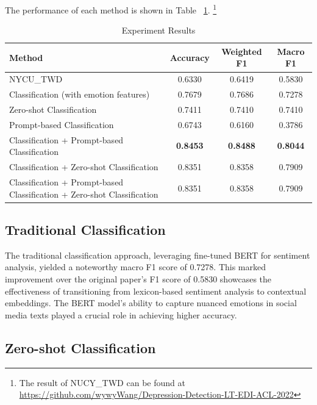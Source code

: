 \documentclass{article}
\begin{document}
The performance of each method is shown in Table ~\ref{table3}. \footnote{The result of NUCY\_TWD can be found at \url{https://github.com/wywyWang/Depression-Detection-LT-EDI-ACL-2022}}

\begin{table}[]
    \caption{Experiment Results}
    \label{table3}
    \centering
    \renewcommand{\arraystretch}{1.5} %
    \begin{tabular}{l|c|c|c}
        \toprule
        \textbf{Method} & \textbf{Accuracy} & \textbf{Weighted F1} & \textbf{Macro F1} \\
        \midrule
        NYCU\_TWD & 0.6330 & 0.6419 & 0.5830 \\
        \midrule \midrule
        Classification (with emotion features) & 0.7679 & 0.7686 & 0.7278 \\ \hline
        Zero-shot Classification & 0.7411 & 0.7410 & 0.7410 \\ \hline
        Prompt-based Classification & 0.6743 & 0.6160 & 0.3786 \\ 
        \midrule \midrule
        Classification + Prompt-based Classification & \textbf{0.8453} & \textbf{0.8488} & \textbf{0.8044} \\ \hline
        Classification + Zero-shot Classification & 0.8351 & 0.8358 & 0.7909 \\ \hline
        \multicolumn{1}{m{7cm}|}{Classification + Prompt-based Classification + Zero-shot Classification} & 0.8351 & 0.8358 & 0.7909 \\
        \bottomrule
    \end{tabular}
\end{table}

\subsection{Traditional Classification}

The traditional classification approach, leveraging fine-tuned BERT for sentiment analysis, yielded a noteworthy macro F1 score of 0.7278. This marked improvement over the original paper's F1 score of 0.5830 showcases the effectiveness of transitioning from lexicon-based sentiment analysis to contextual embeddings. The BERT model's ability to capture nuanced emotions in social media texts played a crucial role in achieving higher accuracy.

\subsection{Zero-shot Classification}
\end{document}
